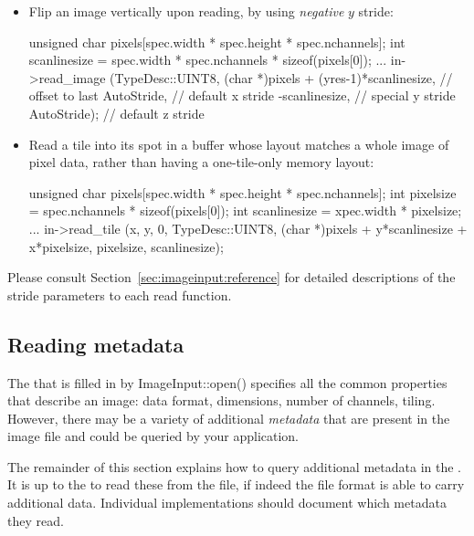 \begin{itemize}
\item Flip an image vertically upon reading, by using \emph{negative}
  $y$ stride:
  \begin{code}
        unsigned char pixels[spec.width * spec.height * spec.nchannels];
        int scanlinesize = spec.width * spec.nchannels * sizeof(pixels[0]);
        ...
        in->read_image (TypeDesc::UINT8,
                        (char *)pixels + (yres-1)*scanlinesize,  // offset to last
                        AutoStride,                      // default x stride
                        -scanlinesize,                   // special y stride
                        AutoStride);                     // default z stride
  \end{code}
\item Read a tile into its spot in a buffer whose layout matches
  a whole image of pixel data,
  rather than having a one-tile-only memory layout:
  \begin{code}
        unsigned char pixels[spec.width * spec.height * spec.nchannels];
        int pixelsize = spec.nchannels * sizeof(pixels[0]);
        int scanlinesize = xpec.width * pixelsize;
        ...
        in->read_tile (x, y, 0, TypeDesc::UINT8,
                       (char *)pixels + y*scanlinesize + x*pixelsize,
                       pixelsize,
                       scanlinesize);
  \end{code}
\end{itemize}

Please consult Section~\ref{sec:imageinput:reference} for detailed
descriptions of the stride parameters to each {\cf read} function.


\subsection{Reading metadata}
\label{sec:imageinput:metadata}

The \ImageSpec that is filled in by {\cf ImageInput::open()}
specifies all the common properties that describe an image: data format,
dimensions, number of channels, tiling.  However, there may be a variety
of additional \emph{metadata} that are present in the image file and
could be queried by your application.

The remainder of this section explains how to query additional metadata
in the \ImageSpec.  It is up to the \ImageInput to read these
from the file, if indeed the file format is able to carry additional
data.  Individual \ImageInput implementations should document which
metadata they read.

